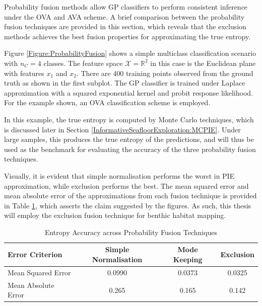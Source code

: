 				Probability fusion methods allow GP classifiers to perform consistent inference under the OVA and AVA scheme. A brief comparison between the probability fusion techniques are provided in this section, which reveals that the exclusion methods achieves the best fusion properties for approximating the true entropy.
						
				Figure \ref{Figure:ProbabilityFusion} shows a simple multiclass classification scenario with $n_{C} = 4$ classes. The feature space $\mathcal{X} = \mathbb{R}^{2}$ in this case is the Euclidean plane with features $x_{1}$ and $x_{2}$. There are 400 training points observed from the ground truth as shown in the first subplot. The GP classifier is trained under Laplace approximation with a squared exponential kernel and probit response likelihood. For the example shown, an OVA classification scheme is employed.
				
				In this example, the true entropy is computed by Monte Carlo techniques, which is discussed later in Section \ref{InformativeSeafloorExploration:MCPIE}. Under large samples, this produces the true entropy of the predictions, and will thus be used as the benchmark for evaluating the accuracy of the three probability fusion techniques.
				
				Visually, it is evident that simple normalisation performs the worst in PIE approximation, while exclusion performs the best. The mean squared error and mean absolute error of the approximations from each fusion technique is provided in Table \ref{Table:ProbabilityFusionAccuracy}, which asserts the claim suggested by the figures. As such, this thesis will employ the exclusion fusion technique for benthic habitat mapping.
						
				\begin{table}[t]
					{\footnotesize
					\begin{center}
						\begin{tabular}{ l c c c }
						\hline
						Error Criterion & Simple Normalisation & Mode Keeping & Exclusion \\
						\hline
						Mean Squared Error & 0.0990 & 0.0373 & 0.0325 \\
						Mean Absolute Error & 0.265 & 0.165 & 0.142 \\
						\hline
						\end{tabular}
					\end{center}
					}
			  	\caption{Entropy Accuracy across Probability Fusion Techniques}
			  	\label{Table:ProbabilityFusionAccuracy}
			  	\end{table}	

